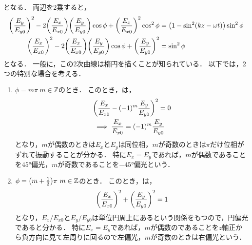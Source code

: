 \documentclass{report}
\begin{document}
    となる．
    両辺を2乗すると，
    \begin{align}
      \qty(\frac{E_{y}}{E_{y0}})^2 - 2\qty(\frac{E_x}{E_{x0}})\qty(\frac{E_{y}}{E_{y0}})\cos\phi + \qty(\frac{E_x}{E_{x0}})^2\cos^2\phi &= \qty(1 - \sin^2(kz - \omega t))\sin^2\phi \\ 
      \qty(\frac{E_{x}}{E_{x0}})^2 - 2\qty(\frac{E_x}{E_{x0}})\qty(\frac{E_{y}}{E_{y0}})\cos\phi + \qty(\frac{E_y}{E_{y0}})^2&= \sin^2\phi \label{elliptical-polarization}
    \end{align}
    となる．
    一般に，この2次曲線は楕円を描くことが知られている．
    以下では，2つの特別な場合を考える．
    \begin{enumerate}
      \item $\phi = m\pi\ m \in \mathbb{Z}$のとき．
        このとき，は，
        \begin{align}
          &\qty(\frac{E_x}{E_{x0}} - (-1)^m\frac{E_y}{E_{y0}})^2 = 0 \\ 
          &\implies \frac{E_x}{E_{x0}} = (-1)^m\frac{E_y}{E_{y0}}
        \end{align}
        となり，$m$が偶数のときは$E_x$と$E_y$は同位相，$m$が奇数のときは$\pi$だけ位相がずれて振動することが分かる．
        特に$E_x = E_y$であれば，$m$が偶数であることを$\ang{45}$偏光，$m$が奇数であることを$-\ang{45}$偏光という．
      \item $\phi = \qty(m + \frac{1}{2})\pi\ m \in \mathbb{Z}$のとき．
        このとき，は，
        \begin{align}
          \qty(\frac{E_x}{E_{x0}})^2 + \qty(\frac{E_y}{E_{y0}})^2 = 1
        \end{align}
        となり，$E_x / E_{x0}$と$E_y / E_{y0}$は単位円周上にあるという関係をもつので，円偏光であると分かる．
        特に$E_x = E_y$であれば，$m$が偶数のであることを$z$軸正から負方向に見て左周りに回るので左偏光，$m$が奇数のときは右偏光という．
    \end{enumerate}
\end{document}
